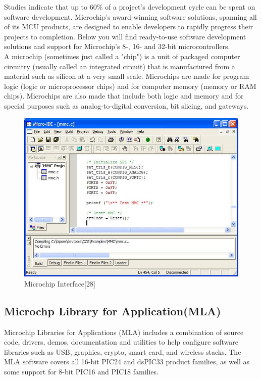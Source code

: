 \documentclass[twoside,a4paper,16pt]{book}
\begin{document}
{{Studies indicate that up to 60\% of a project’s development cycle can be spent on software development. Microchip’s award-winning software solutions, spanning all of its MCU products, are designed to enable developers to rapidly progress their projects to completion. Below you will find ready-to-use software development solutions and support for Microchip’s 8-, 16- and 32-bit microcontrollers.\\
A microchip (sometimes just called a "chip") is a unit of packaged computer circuitry (usually called an integrated circuit) that is manufactured from a material such as silicon at a very small scale. Microchips are made for program logic (logic or microprocessor chips) and for computer memory (memory or RAM chips). Microchips are also made that include both logic and memory and for special purposes such as analog-to-digital conversion, bit slicing, and gateways.
 \begin{figure}[ht!]
	\begin{center}
		\includegraphics[width=15.0cm]{3.jpg}
		\caption{Microchip Interface[28]}
	\end{center}
\end{figure}


\subsection*{Microchp Library for Application(MLA)}
Microchip Libraries for Applications (MLA) includes a combination of source code, drivers, demos, documentation and utilities to help configure software libraries such as USB, graphics, crypto, smart card, and wireless stacks. The MLA software covers all 16-bit PIC24 and dsPIC33 product families, as well as some support for 8-bit PIC16 and PIC18 families.\\
}}
\end{document}
